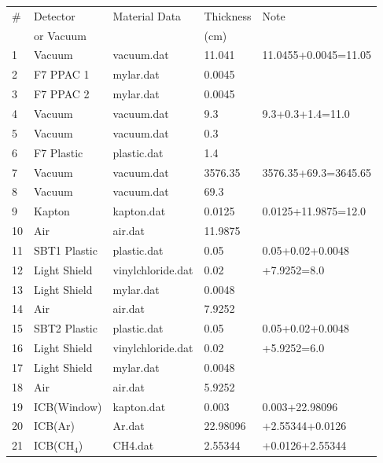 \begin{table}[h]
    \centering
    \begin{tabular}{lllll} \\ \hline
    \# & Detector   &Material Data & Thickness   & Note\\
       & or Vacuum  &      & (cm)        & \\
    \hline
    1 & Vacuum      & vacuum.dat  &  11.041 &   11.0455+0.0045=11.05 \\
    2 & F7 PPAC 1   & mylar.dat   &  0.0045 &\\
    3 & F7 PPAC 2   & mylar.dat   &  0.0045 &\\ \hline
    4 & Vacuum      & vacuum.dat  &  9.3    &9.3+0.3+1.4=11.0 \\
    5 & Vacuum      & vacuum.dat  &  0.3    &\\
    6 & F7 Plastic  & plastic.dat &  1.4    &\\ \hline
    7 & Vacuum      & vacuum.dat  &  3576.35&3576.35+69.3=3645.65 \\
    \cline{1-4}
    8 & Vacuum      & vacuum.dat  & 69.3    & \\\hline
    9 & Kapton      & kapton.dat  & 0.0125  & 0.0125+11.9875=12.0 \\
    10& Air         & air.dat     & 11.9875 & \\\hline
    11& SBT1 Plastic& plastic.dat & 0.05    &0.05+0.02+0.0048  \\
    12& Light Shield&vinylchloride.dat& 0.02&+7.9252=8.0     \\
    13& Light Shield&  mylar.dat  & 0.0048  & \\
    \cline{1-4}
    14 & Air     & air.dat     & 7.9252  &   \\ 
    \hline
    15& SBT2 Plastic& plastic.dat & 0.05    & 0.05+0.02+0.0048\\
    16& Light Shield& vinylchloride.dat& 0.02& +5.9252=6.0\\
    17& Light Shield& mylar.dat  & 0.0048 & \\
    \cline{1-4}
    18 & Air     & air.dat    & 5.9252 &  \\\hline
    19 & ICB(Window)& kapton.dat & 0.003  & 0.003+22.98096 \\
    20 & ICB(Ar)    & Ar.dat     &22.98096& +2.55344+0.0126\\
    21 & ICB(CH$_4$)& CH4.dat    &2.55344 & +0.0126+2.55344 \\

\end{tabular}
\end{table}
